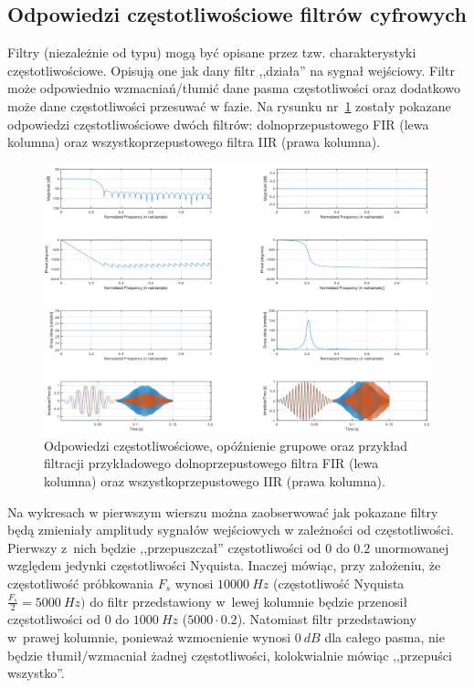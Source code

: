 \subsection{Odpowiedzi częstotliwościowe filtrów cyfrowych}
Filtry (niezależnie od typu) mogą być opisane przez tzw. charakterystyki częstotliwościowe. Opisują one jak dany filtr ,,działa'' na sygnał wejściowy. Filtr może odpowiednio wzmacniań/tłumić dane pasma częstotliwości oraz dodatkowo może dane częstotliwości przesuwać w fazie. Na rysunku nr~\ref{lab3/fig/frequenciesResponses} zostały pokazane odpowiedzi częstotliwościowe dwóch filtrów: dolnoprzepustowego FIR (lewa kolumna) oraz wszystkoprzepustowego filtra IIR (prawa kolumna).
\begin{figure}[hbt!]
	\centering
	\includegraphics[width=0.95\linewidth]{images/frequenciesResponses.png}
	\caption{Odpowiedzi częstotliwościowe, opóźnienie grupowe oraz przykład filtracji przykładowego dolnoprzepustowego filtra FIR (lewa kolumna) oraz wszystkoprzepustowego IIR (prawa kolumna).}
	\label{lab3/fig/frequenciesResponses}
\end{figure}
Na wykresach w pierwszym wierszu można zaobserwować jak pokazane filtry będą zmieniały amplitudy sygnałów wejściowych w zależności od częstotliwości. Pierwszy z~nich będzie ,,przepuszczał'' częstotliwości od $0$ do $0.2$ unormowanej względem jedynki częstotliwości Nyquista. Inaczej mówiąc, przy założeniu, że częstotliwość próbkowania $F_s$ wynosi $10000~Hz$ (częstotliwość Nyquista $\frac{F_s}{2} = 5000~Hz)$ do filtr przedstawiony w~lewej kolumnie będzie przenosił częstotliwości od $0$ do $1000~Hz$ ($5000\cdot0.2$). Natomiast filtr przedstawiony w~prawej kolumnie, ponieważ wzmocnienie wynosi $0~dB$ dla całego pasma, nie będzie tłumił/wzmacniał żadnej częstotliwości, kolokwialnie mówiąc ,,przepuści wszystko''.

